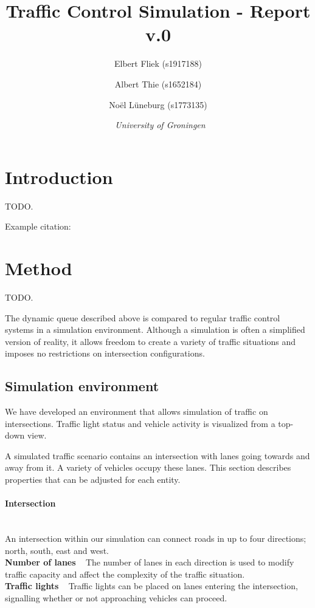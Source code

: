 \documentclass{article}
\title{\textbf{\huge Traffic Control Simulation - Report v.0}}
\author{Elbert Fliek (s1917188) \affila \and
    Albert Thie (s1652184) \affila \and
    No\"el L\"uneburg (s1773135) \affila}
\date{\affila\ \textit{University of Groningen}}
\begin{document}
\ttl
\thispagestyle{empty}




\section{Introduction}
TODO. 

Example citation: \cite{survey2014}

\section{Method}
TODO. %

The dynamic queue described above is compared to regular traffic control systems in a simulation environment. Although a simulation is often a simplified version of reality, it allows freedom to create a variety of traffic situations and imposes no restrictions on intersection configurations.

\subsection{Simulation environment}
We have developed an environment that allows simulation of traffic on intersections. Traffic light status and vehicle activity is visualized from a top-down view.

A simulated traffic scenario contains an intersection with lanes going towards and away from it. A variety of vehicles occupy these lanes. This section describes properties that can be adjusted for each entity.

\paragraph{Intersection} ~\\
An intersection within our simulation can connect roads in up to four directions; north, south, east and west. \\
\textbf{Number of lanes} ~ The number of lanes in each direction is used to modify traffic capacity and affect the complexity of the traffic situation.\\
\textbf{Traffic lights} ~ Traffic lights can be placed on lanes entering the intersection, signalling whether or not approaching vehicles can proceed.
\end{document}
